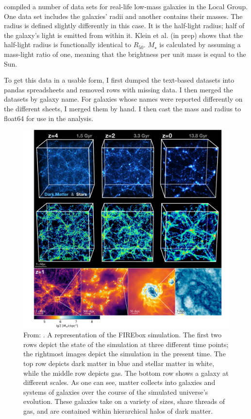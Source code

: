\cite{mcconnachieOBSERVEDPROPERTIESDWARF2012} compiled a number of data sets for real-life low-mass galaxies in the Local Group. One data set includes the galaxies' radii and another contains their masses. The radius is defined slightly differently in this case. It is the half-light radius; half of the galaxy's light is emitted from within it.
Klein et al. (in prep) shows that the half-light radius is functionally identical to $R_{50}$. $M_\star$ is calculated by assuming a mass-light ratio of one, meaning that the brightness per unit mass is equal to the Sun.

To get this data in a usable form, I first dumped the text-based datasets into pandas spreadsheets and removed rows with missing data. I then merged the datasets by galaxy name. For galaxies whose names were reported differently on the different sheets, I merged them by hand. I then cast the mass and radius to float64 for use in the analysis.

\begin{figure}
    \includegraphics*[width=\textwidth]{figs/feldmann/fig1.pdf}
    \caption{
        From: \cite{feldmannFIREboxSimulatingGalaxies2022}. A representation of the FIREbox simulation. The first two rows depict the state of the simulation at three different time points; the rightmost images depict the simulation in the present time. The top row depicts dark matter in blue and stellar matter in white, while the middle row depicts gas. The bottom row shows a galaxy at different scales. As one can see, matter collects into galaxies and systems of galaxies over the course of the simulated universe's evolution. These galaxies take on a variety of sizes, share threads of gas, and are contained within hierarchical halos of dark matter.
    }
    \label{fig:feldmann-visual}
\end{figure}

